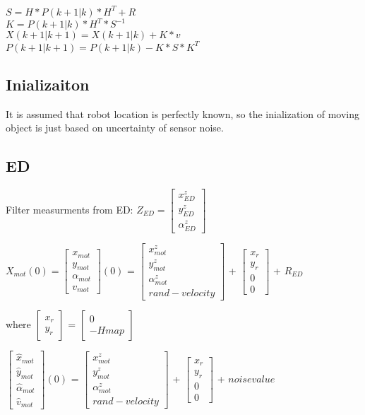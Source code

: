 \documentclass[11pt,a4paper]{article}
\begin{document}
\noindent$S=H*P(k+1|k)*H^{T} + R$\\
$K=P(k+1|k)*H^{T}*S^{-1}$\\
$X(k+1|k+1) = X(k+1|k) + K*v$\\
$P(k+1|k+1) = P(k+1|k) - K*S*K^{T}$


\subsection{Inializaiton}
It is assumed that robot location is perfectly known, so the inialization of moving object is just based on uncertainty of sensor noise.

\subsection{ED}
\noindent Filter measurments from ED: $Z_{ED} = \begin{bmatrix} x_{ED}^{z} \\ y_{ED}^{z} \\ \alpha_{ED}^{z} \end{bmatrix}$  

$ X_{mot}(0) = \begin{bmatrix} x_{mot} \\ y_{mot} \\ \alpha_{mot} \\ v_{mot} \end{bmatrix}(0)$ = $\begin{bmatrix} x_{mot}^{z} \\ y_{mot}^{z} \\ \alpha_{mot}^{z} \\ rand-velocity \end{bmatrix}$ + $\begin{bmatrix} x_{r} \\ y_{r} \\ 0 \\ 0 \end{bmatrix}$   + $R_{ED}$

\noindent where $\begin{bmatrix} x_{r} \\ y_{r} \end{bmatrix}$ = $\begin{bmatrix} 0 \\ -Hmap \end{bmatrix}$

$ \begin{bmatrix} \hat{x}_{mot} \\ \hat{y}_{mot} \\ \hat{\alpha}_{mot} \\ \hat{v}_{mot} \end{bmatrix}(0)$ = $\begin{bmatrix} x_{mot}^{z} \\ y_{mot}^{z} \\ \alpha_{mot}^{z} \\ rand-velocity \end{bmatrix}$ + $\begin{bmatrix} x_{r} \\ y_{r} \\ 0 \\ 0 \end{bmatrix}$   + $noisevalue$
\end{document}

